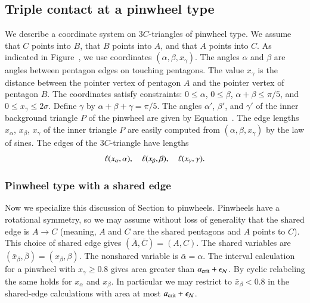 \subsection{Triple contact at a pinwheel type}

We describe a coordinate system on $3C$-triangles of pinwheel type.
We assume that $C$ points into $B$, that $B$ points into $A$, and that
$A$ points into $C$.  As indicated in Figure~,
we use coordinates $(\alpha,\beta,x_\gamma)$.  The angles $\alpha$ and
$\beta$ are angles between pentagon edges on touching pentagons.  The
value $x_\gamma$ is the distance between the pointer vertex of
pentagon $A$ and the pointer vertex of pentagon $B$.  The coordinates
satisfy constraints: $0\le\alpha$, $0\le\beta$, $\alpha+\beta\le
\pi/5$, and $0\le x_\gamma\le 2\sigma$.  Define $\gamma$ by
$\alpha+\beta+\gamma=\pi/5$.  The angles $\alpha'$, $\beta'$, and
$\gamma'$ of the inner background triangle $P$ of the pinwheel are
given by Equation~.  The edge lengths $x_\alpha$,
$x_\beta$, $x_\gamma$ of the inner triangle $P$ are easily computed
from $(\alpha,\beta,x_\gamma)$ by the law of sines.  The edges of the
$3C$-triangle have lengths
\[
\ell(x_\alpha,\alpha),\quad 
\ell(x_\beta,\beta),\quad \ell(x_\gamma,\gamma).
\]


\subsubsection{Pinwheel type with a shared edge}

Now we specialize this discussion of Section  to
pinwheels.  Pinwheels have a rotational symmetry, so we may assume
without loss of generality that the shared edge is $A\to C$ (meaning,
$A$ and $C$ are the shared pentagons and $A$ points to $C$).  This
choice of shared edge gives $(\bar A,\bar C) = (A,C)$.  The shared
variables are $(\bar x_\beta,\bar\beta)=(x_\beta,\beta)$.  The
nonshared variable is $\bar\alpha=\alpha$. The interval calculation
for a pinwheel with $x_\gamma\ge0.8$ gives area greater than
$a_\text{crit}+\epsilon_{\mathcal N}$. By cyclic relabeling the same holds for $x_\alpha$
and $x_\beta$. In particular we may restrict to $\bar x_\beta<0.8$
in the shared-edge calculations with area at most $a_\text{crit}+\epsilon_{\mathcal N}$.

